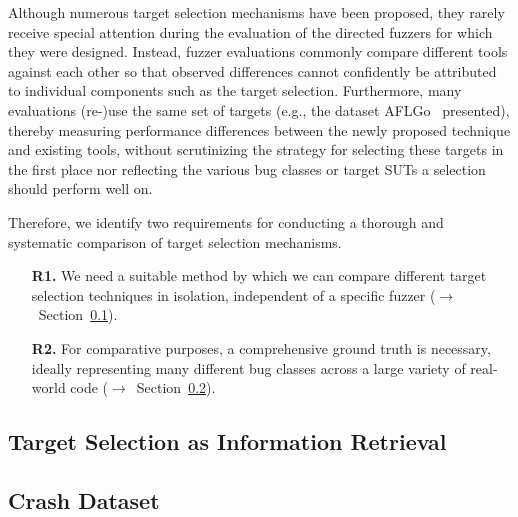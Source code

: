 Although numerous target selection mechanisms have been proposed, they rarely receive special attention during the evaluation of the directed fuzzers for which they were designed. Instead, fuzzer evaluations commonly compare different tools against each other so that observed differences cannot confidently be attributed to individual components such as the target selection. 
%
Furthermore, many evaluations (re-)use the same set of targets (e.g., the dataset AFLGo~\cite{BöhPhaNguRoy+17} presented), thereby measuring performance differences between the newly proposed technique and existing tools, without scrutinizing the strategy for selecting these targets in the first place nor reflecting the various bug classes or target SUTs a selection should perform well on.

 Therefore, we identify two requirements for conducting a thorough and systematic comparison of target selection mechanisms.
%
\begin{itemize}
    \setlength{\itemsep}{4pt}
    \item[\textbf{R1.}] We need a suitable method by which we can compare different target selection techniques in isolation, independent of a specific fuzzer ($\rightarrow$~Section~\ref{sec:methodology}).
    \item[\textbf{R2.}] For comparative purposes, a comprehensive ground truth is necessary, ideally representing many different bug classes across a large variety of real-world code
    ($\rightarrow$~Section~\ref{sec:dataset}).
\end{itemize}

\subsection{Target Selection as Information Retrieval}
\label{sec:methodology}


\subsection{Crash Dataset}
\label{sec:dataset}

